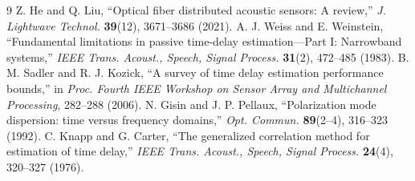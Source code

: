 \documentclass[10pt]{article}
\begin{document}
\begin{thebibliography}{9}\footnotesize
{} Z. He and Q. Liu, ``Optical fiber distributed acoustic sensors: A review,'' \emph{J. Lightwave Technol.} \textbf{39}(12), 3671--3686 (2021).
 A. J. Weiss and E. Weinstein, ``Fundamental limitations in passive time-delay estimation---Part I: Narrowband systems,'' \emph{IEEE Trans. Acoust., Speech, Signal Process.} \textbf{31}(2), 472--485 (1983).
 B. M. Sadler and R. J. Kozick, ``A survey of time delay estimation performance bounds,'' in \emph{Proc. Fourth IEEE Workshop on Sensor Array and Multichannel Processing}, 282--288 (2006).
 N. Gisin and J. P. Pellaux, ``Polarization mode dispersion: time versus frequency domains,'' \emph{Opt. Commun.} \textbf{89}(2--4), 316--323 (1992).
 C. Knapp and G. Carter, ``The generalized correlation method for estimation of time delay,'' \emph{IEEE Trans. Acoust., Speech, Signal Process.} \textbf{24}(4), 320--327 (1976).
\end{thebibliography}
\end{document}
